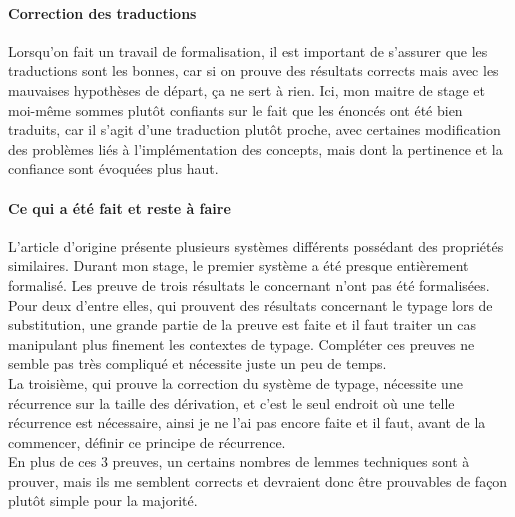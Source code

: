 \documentclass[10pt]{article}
\begin{document}
\paragraph{Correction des traductions} Lorsqu'on fait un travail de formalisation, il est important de s'assurer que les traductions sont les bonnes, car si on prouve des résultats corrects mais avec les mauvaises hypothèses de départ, ça ne sert à rien. Ici, mon maitre de stage et moi-même sommes plutôt confiants sur le fait que les énoncés ont été bien traduits, car il s'agit d'une traduction plutôt proche, avec certaines modification des problèmes liés à l'implémentation des concepts, mais dont la pertinence et la confiance sont évoquées plus haut.


\paragraph{Ce qui a été fait et reste à faire} L'article d'origine présente plusieurs systèmes différents possédant des propriétés similaires. Durant mon stage, le premier système a été presque entièrement formalisé. Les preuve de trois résultats le concernant n'ont pas été formalisées. \\ Pour deux d'entre elles, qui prouvent des résultats concernant le typage lors de substitution, une grande partie de la preuve est faite et il faut traiter un cas manipulant plus finement les contextes de typage. Compléter ces preuves ne semble pas très compliqué et nécessite juste un peu de temps. \\
La troisième, qui prouve la correction du système de typage, nécessite une récurrence sur la taille des dérivation, et c'est le seul endroit où une telle récurrence est nécessaire, ainsi je ne l'ai pas encore faite et il faut, avant de la commencer, définir ce principe de récurrence. \\
En plus de ces 3 preuves, un certains nombres de lemmes techniques sont à prouver, mais ils me semblent corrects et devraient donc être prouvables de façon plutôt simple pour la majorité.
\end{document}

